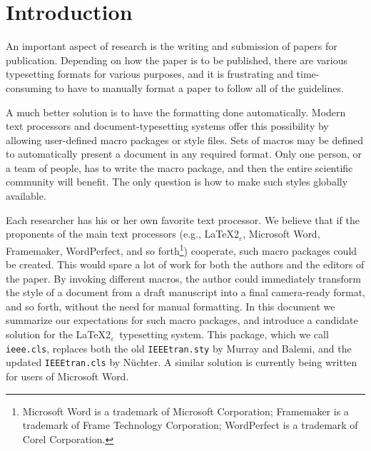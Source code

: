 \documentclass[%
	final,
	notitlepage,
	narroweqnarray,
	inline,
	twoside,
	]{ieee}
\newcommand{\latexiie}{\LaTeX2{\Large$_\varepsilon$}}
\begin{document}

\section{Introduction}

\PARstart An important aspect of research is the writing and
submission of papers for publication. Depending on how the paper is to
be published, there are various typesetting formats for various
purposes, and it is frustrating and time-consuming to have to manually
format a paper to follow all of the guidelines.

A much better solution is to have the formatting done automatically.
Modern text processors and document-typesetting systems offer this
possibility by allowing user-defined macro packages or style files.
Sets of macros may be defined to automatically present a document in
any required format. Only one person, or a team of people, has to
write the macro package, and then the entire scientific community will
benefit. The only question is how to make such styles globally
available.

Each researcher has his or her own favorite text processor. We believe
that if the proponents of the main text processors (e.g., \latexiie,
Microsoft Word, Framemaker, WordPerfect, and so
forth\footnote{Microsoft Word is a trademark of Microsoft Corporation;
Frame\-maker is a trademark of Frame Technology Corporation;
WordPerfect is a trademark of Corel Corporation.}) cooperate, such
macro packages could be created. This would spare a lot of work for
both the authors and the editors of the paper.  By invoking different
macros, the author could immediately transform the style of a document
from a draft manuscript into a final camera-ready format, and so
forth, without the need for manual formatting.  In this document we
summarize our expectations for such macro packages, and introduce a
candidate solution for the \latexiie\ typesetting system. This
package, which we call \texttt{ieee.cls}, replaces both the old
\texttt{IEEEtran.sty} by Murray and Balemi, and the updated
\texttt{IEEEtran.cls} by N\"{u}chter. A similar solution is currently
being written for users of Microsoft Word.

\end{document}
